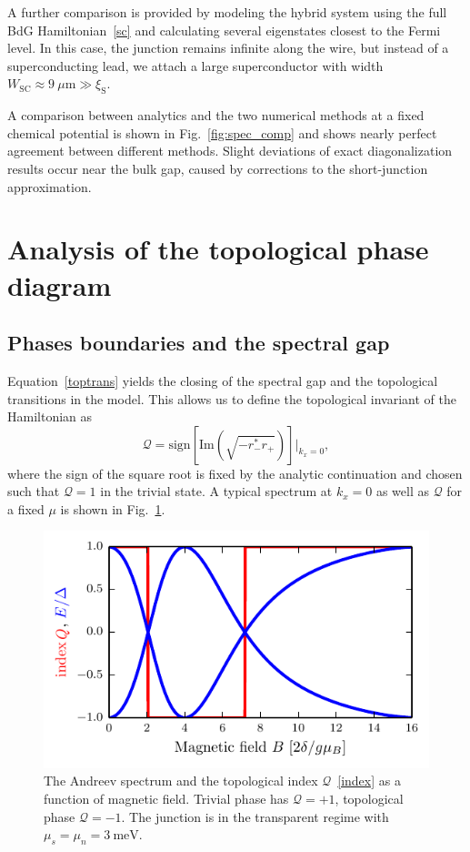 A further comparison is provided by modeling the hybrid system using the full BdG Hamiltonian~\eqref{sc} and calculating several eigenstates closest to the Fermi level.
In this case, the junction remains infinite along the wire, but instead of a superconducting lead, we attach a large superconductor with width $W_\mathrm{SC} \approx \SI{9}{\mu\m} \gg \xi_\mathrm{S}$.

A comparison between analytics and the two numerical methods at a fixed chemical potential is shown in Fig.~\ref{fig:spec_comp} and shows nearly perfect agreement between different methods.
Slight deviations of exact diagonalization results occur near the bulk gap, caused by corrections to the short-junction approximation.

\section{Analysis of the topological phase diagram}
\label{sec:topphases}

\subsection{Phases boundaries and the spectral gap}
\label{sec:phas-bound-spectr}

Equation~\eqref{toptrans} yields the closing of the spectral gap and the topological transitions in the model.
This allows us to define the topological invariant of the Hamiltonian as
\begin{equation}\label{index}
\mathcal Q=\mathrm{sign}[\mathrm{Im}(\sqrt{-r_-^*r_+})]|_{k_x=0},
\end{equation}
where the sign of the square root is fixed by the analytic continuation and chosen such that $\mathcal Q=1$ in the trivial state.
A typical spectrum at $k_x = 0$ as well as $\mathcal Q$ for a fixed $\mu$ is shown in Fig.~\ref{fig:index}.

\begin{figure}
\begin{center}
\includegraphics[width=0.7\columnwidth]{chapter_shortjunction/figures/index}
\caption{The Andreev spectrum and the topological index $\mathcal Q$~\eqref{index} as a function of magnetic field.
Trivial phase has $\mathcal{Q}=+1$, topological phase $\mathcal{Q}=-1$.
The junction is in the transparent regime with $\mu_s=\mu_n=\SI{3}{\meV}$.}
\label{fig:index}
\end{center}
\end{figure}

